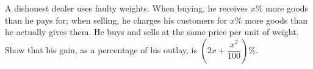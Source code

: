 A dishonest dealer uses faulty weights. When buying, he receives $x\%$ more goods than he pays for; when selling, he charges his customers for $x\%$ more goods than he actually gives them. He buys and sells at the same price per unit of weight. Show that his gain, as a percentage of his outlay, is $\left(2x+\dfrac{x^2}{100}\right)\%$.
